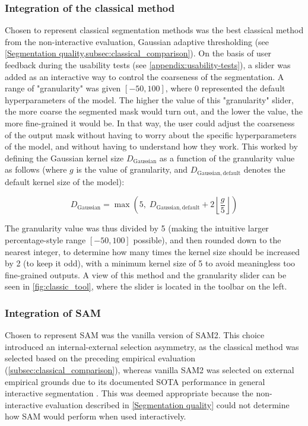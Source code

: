 \subsubsection{Integration of the classical method}
Chosen to represent classical segmentation methods was the best classical method from the non-interactive evaluation, Gaussian adaptive thresholding (see \cref{Segmentation quality,subsec:classical_comparison}).
On the basis of user feedback during the usability tests (see \cref{appendix:usability-tests}), a slider was added as an interactive way to control the coarseness of the segmentation.
A range of "granularity" was given $[-50,100]$, where 0 represented the default hyperparameters of the model.
The higher the value of this "granularity" slider, the more coarse the segmented mask would turn out, and the lower the value, the more fine-grained it would be.
In that way, the user could adjust the coarseness of the output mask without having to worry about the specific hyperparameters of the model, and without having to understand how they work.
This worked by defining the Gaussian kernel size $D_{\mathrm{Gaussian}}$ as a function of the granularity value as follows (where $g$ is the value of granularity, and $D_{\mathrm{Gaussian,default}}$ denotes the default kernel size of the model):

$$D_{\mathrm{Gaussian}} = \max\left(5,\; D_{\mathrm{Gaussian,default}} + 2\left\lfloor \frac{g}{5} \right\rfloor \right)$$

The granularity value was thus divided by 5 (making the intuitive larger percentage-style range $[-50,100]$ possible), and then rounded down to the nearest integer, to determine how many times the kernel size should be increased by 2 (to keep it odd), with a minimum kernel size of 5 to avoid meaningless too fine-grained outputs.
A view of this method and the granularity slider can be seen in \cref{fig:classic_tool}, where the slider is located in the toolbar on the left.


\subsubsection{Integration of SAM}
Chosen to represent \acs{SAM} was the vanilla version of \acs{SAM}2.
This choice introduced an internal-external selection asymmetry, as the classical method was selected based on the preceding empirical evaluation (\cref{subsec:classical_comparison}), whereas vanilla \acs{SAM}2 was selected on external empirical grounds due to its documented \acs{SOTA} performance in general interactive segmentation \parencite{sam2}.
This was deemed appropriate because the non-interactive evaluation described in \cref{Segmentation quality} could not determine how \acs{SAM} would perform when used interactively.

